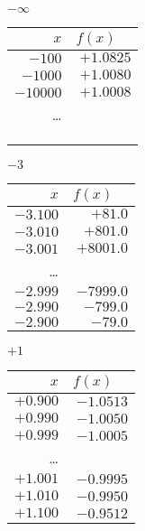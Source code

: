 \begin{esempio}
\vspace{1em}
\begin{minipage}{.24\textwidth}
\begin{center}
\(-\infty\)\\
\begin{tabular}{r|r}
\(x\) & \(f(x)\quad\)\\\hline
\(-100\) & \(+1.0825\) \\ 
\(-1000\) & \(+1.0080\) \\ 
\(-10000\) & \(+1.0008\) \\
\dots \\
&\\
&\\
&
\end{tabular}
\end{center}
\end{minipage}
\begin{minipage}{.24\textwidth}
\begin{center}
\(-3\)\\
\begin{tabular}{r|r}
\(x\) & \(f(x)\quad\)\\\hline
\(-3.100\) & \(+81.0\) \\ 
\(-3.010\) & \(+801.0\) \\ 
\(-3.001\) & \(+8001.0\) \\
\dots \\
\(-2.999\) & \(-7999.0\) \\ 
\(-2.990\) & \(-799.0\) \\ 
\(-2.900\) & \(-79.0\) \\
\end{tabular}
\end{center}
\end{minipage}
\begin{minipage}{.24\textwidth}
\begin{center}
\(+1\)\\
\begin{tabular}{r|r}
\(x\) & \(f(x)\quad\)\\\hline
\(+0.900\) & \(-1.0513\) \\ 
\(+0.990\) & \(-1.0050\) \\ 
\(+0.999\) & \(-1.0005\) \\
\dots \\
\(+1.001\) & \(-0.9995\) \\ 
\(+1.010\) & \(-0.9950\) \\ 
\(+1.100\) & \(-0.9512\) \\
\end{tabular}

\end{center}
\end{minipage}
\end{esempio}
